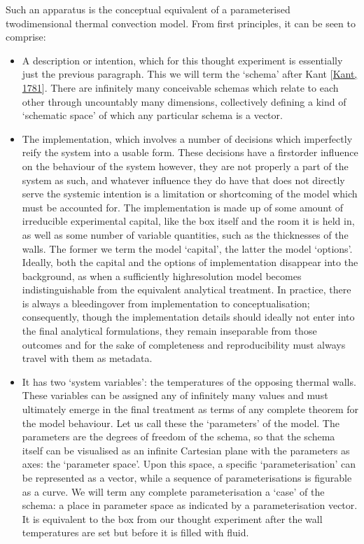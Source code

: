 \documentclass[letterpaper,10pt,english]{jupyterBook}
\begin{document}
\sphinxAtStartPar
Such an apparatus is the conceptual equivalent of a parameterised two\sphinxhyphen{}dimensional thermal convection model. From first principles, it can be seen to comprise:
\begin{itemize}
\item {} 
\sphinxAtStartPar
A description or intention, which for this thought experiment is essentially just the previous paragraph. This we will term the ‘schema’ after Kant {[}\hyperlink{cite.references:id683}{Kant, 1781}{]}. There are infinitely many conceivable schemas which relate to each other through uncountably many dimensions, collectively defining a kind of ‘schematic space’ of which any particular schema is a vector.

\item {} 
\sphinxAtStartPar
The implementation, which involves a number of decisions which imperfectly reify the system into a usable form. These decisions have a first\sphinxhyphen{}order influence on the behaviour of the system \sphinxhyphen{} however, they are not properly a part of the system as such, and whatever influence they do have that does not directly serve the systemic intention is a limitation or shortcoming of the model which must be accounted for. The implementation is made up of some amount of irreducible experimental capital, like the box itself and the room it is held in, as well as some number of variable quantities, such as the thicknesses of the walls. The former we term the model ‘capital’, the latter the model ‘options’. Ideally, both the capital and the options of implementation disappear into the background, as when a sufficiently high\sphinxhyphen{}resolution model becomes indistinguishable from the equivalent analytical treatment. In practice, there is always a bleeding\sphinxhyphen{}over from implementation to conceptualisation; consequently, though the implementation details should ideally not enter into the final analytical formulations, they remain inseparable from those outcomes and \sphinxhyphen{} for the sake of completeness and reproducibility \sphinxhyphen{} must always travel with them as metadata.

\item {} 
\sphinxAtStartPar
It has two ‘system variables’: the temperatures of the opposing thermal walls. These variables can be assigned any of infinitely many values and must ultimately emerge in the final treatment as terms of any complete theorem for the model behaviour. Let us call these the ‘parameters’ of the model. The parameters are the degrees of freedom of the schema, so that the schema itself can be visualised as an infinite Cartesian plane with the parameters as axes: the ‘parameter space’. Upon this space, a specific ‘parameterisation’ can be represented as a vector, while a sequence of parameterisations is figurable as a curve. We will term any complete parameterisation a ‘case’ of the schema: a place in parameter space as indicated by a parameterisation vector. It is equivalent to the box from our thought experiment after the wall temperatures are set but before it is filled with fluid.


\end{itemize}
\end{document}
